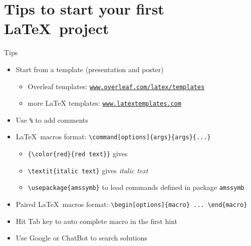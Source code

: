 \documentclass [xcolor=svgnames, t] {beamer}
\begin{document}
\section{Tips to start your first \LaTeX\ project}
\begin{frame}[fragile]{Tips}
    \begin{itemize}
        \item Start from a template (presentation and poster)
            \begin{itemize}
                \item Overleaf templates:
                    \href{https://www.overleaf.com/latex/templates}{\texttt{www.overleaf.com/latex/templates}}
                \item more LaTeX templates: \href{https://www.latextemplates.com}{\texttt{www.latextemplates.com}}
            \end{itemize}
        \item Use \verb|%| to add comments
        \item \LaTeX\ macros format: \verb|\command[options]{args}{args}{...}|
        \begin{itemize}
            \item \verb|{\color{red}{red text}}| gives {\color{red}{red text}}
            \item \verb|\textit{italic text}| gives \textit{italic text}
            \item \verb|\usepackage{amssymb}| to load commands defined in package \texttt{amssymb}
        \end{itemize}
        \item Paired \LaTeX\ macros format: \verb|\begin[options]{macro} ... \end{macro}|
        \item Hit Tab key to auto complete macro in the first hint
        \item Use Google or ChatBot to search solutions
    \end{itemize}
\end{frame}
\end{document}
